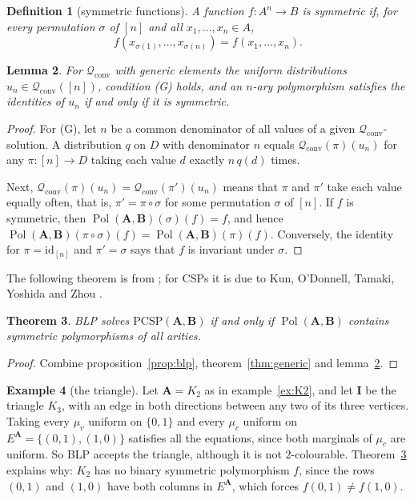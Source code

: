 \documentclass[11pt]{article}
\theoremstyle{plain}
\newtheorem{theorem}{Theorem}[section]
\newtheorem{lemma}[theorem]{Lemma}
\newtheorem{definition}[theorem]{Definition}
\theoremstyle{definition}
\newtheorem{example}[theorem]{Example}
\newcommand{\Pol}{\operatorname{Pol}}
\newcommand{\id}{\mathrm{id}}
\newcommand{\bA}{\mathbf{A}}
\newcommand{\bB}{\mathbf{B}}
\newcommand{\bI}{\mathbf{I}}
\newcommand{\Qc}{\mathscr{Q}_{\mathrm{conv}}}
\newcommand{\PCSP}{\mathrm{PCSP}}
\begin{document}
\begin{definition}[symmetric functions]
A function $f\colon A^n\to B$ is \emph{symmetric} if, for every permutation $\sigma$ of $[n]$ and all $x_1,\dots,x_n\in A$,
\[
f(x_{\sigma(1)},\dots,x_{\sigma(n)})=f(x_1,\dots,x_n).
\]
\end{definition}

\begin{lemma}\label{lem:gen-Q}
For $\Qc$ with generic elements the uniform distributions $u_n\in\Qc([n])$, condition (G) holds, and an $n$-ary polymorphism satisfies the identities of $u_n$ if and only if it is symmetric.
\end{lemma}

\begin{proof}
For (G), let $n$ be a common denominator of all values of a given $\Qc$-solution. A distribution $q$ on $D$ with denominator $n$ equals $\Qc(\pi)(u_n)$ for any $\pi\colon[n]\to D$ taking each value $d$ exactly $n\,q(d)$ times.

Next, $\Qc(\pi)(u_n)=\Qc(\pi')(u_n)$ means that $\pi$ and $\pi'$ take each value equally often, that is, $\pi'=\pi\circ\sigma$ for some permutation $\sigma$ of $[n]$. If $f$ is symmetric, then $\Pol(\bA,\bB)(\sigma)(f)=f$, and hence $\Pol(\bA,\bB)(\pi\circ\sigma)(f)=\Pol(\bA,\bB)(\pi)(f)$. Conversely, the identity for $\pi=\id_{[n]}$ and $\pi'=\sigma$ says that $f$ is invariant under $\sigma$.
\end{proof}

The following theorem is from \cite{BBKO}; for CSPs it is due to Kun, O'Donnell, Tamaki, Yoshida and Zhou \cite{KOTYZ}.

\begin{theorem}\label{thm:blp}
BLP solves $\PCSP(\bA,\bB)$ if and only if $\Pol(\bA,\bB)$ contains symmetric polymorphisms of all arities.
\end{theorem}

\begin{proof}
Combine proposition~\ref{prop:blp}, theorem~\ref{thm:generic} and lemma~\ref{lem:gen-Q}.
\end{proof}

\begin{example}[the triangle]\label{ex:triangle}
Let $\bA=K_2$ as in example~\ref{ex:K2}, and let $\bI$ be the triangle $K_3$, with an edge in both directions between any two of its three vertices. Taking every $\mu_v$ uniform on $\{0,1\}$ and every $\mu_c$ uniform on $E^{\bA}=\{(0,1),(1,0)\}$ satisfies all the equations, since both marginals of $\mu_c$ are uniform. So BLP accepts the triangle, although it is not $2$-colourable. Theorem~\ref{thm:blp} explains why: $K_2$ has no binary symmetric polymorphism $f$, since the rows $(0,1)$ and $(1,0)$ have both columns in $E^{\bA}$, which forces $f(0,1)\neq f(1,0)$.
\end{example}
\end{document}
